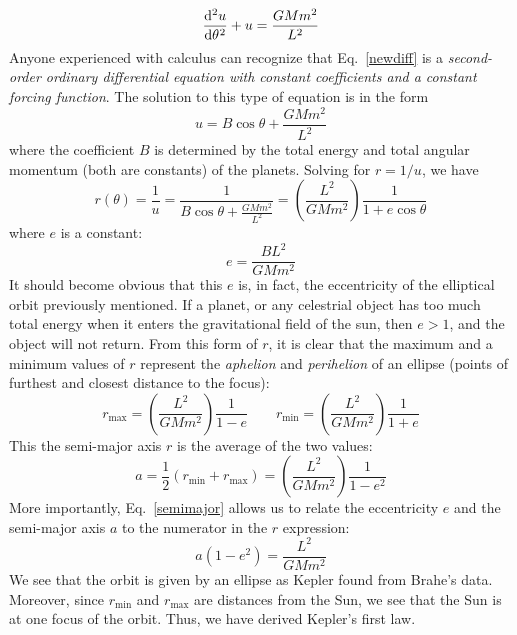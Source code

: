 \documentclass{../../../oss-handout}
\begin{document}
\begin{equation}
  \diff[2]u\theta + u = \frac{GMm^2}{L^2}
  \label{newdiff}
\end{equation}
Anyone experienced with calculus can recognize that Eq.\ \ref{newdiff} is a
\emph{second-order ordinary differential equation with constant coefficients
  and a constant forcing function}. The solution to this type of equation is in
the form
\begin{equation} 
  u =B\cos\theta + \frac{GMm^2}{L^2}
\end{equation}
where the coefficient $B$ is determined by the total energy and total angular
momentum (both are constants) of the planets. Solving for $r=1/u$, we have
\begin{equation}
  r(\theta)=\frac1u = \frac1{B\cos\theta+ \frac{GMm^2}{L^2}}
  =\left(\frac{L^2}{GMm^2}\right)\frac1{1+e\cos\theta}
\end{equation}
where $e$ is a constant:
\begin{equation}
  e=\dfrac{BL^2}{GMm^2}
\end{equation}
It should become obvious that this $e$ is, in fact, the eccentricity of the
elliptical orbit previously mentioned. If a planet, or any celestrial object
has too much total energy when it enters the gravitational field of the sun,
then $e>1$, and the object will not return. From this form of $r$, it is clear
that the maximum and a minimum values of $r$ represent the \emph{aphelion} and
\emph{perihelion} of an ellipse (points of furthest and closest distance to the
focus):
\begin{equation}
  r_\text{max}=\left(\frac{L^2}{GMm^2}\right)\frac1{1-e}
  \quad\quad
  r_\text{min}=\left(\frac{L^2}{GMm^2}\right)\frac1{1+e}
\end{equation}
This the semi-major axis $r$ is the average of the two values:
\begin{equation}
  a=\dfrac12\left(r_\text{min} + r_\text{max}\right)=
  \left(\frac{L^2}{GMm^2}\right)\frac1{1-e^2}
  \label{semimajor}
\end{equation}
More importantly, Eq.\ \ref{semimajor} allows us to relate the eccentricity
$e$ and the semi-major axis $a$ to the numerator in the $r$ expression:
\begin{equation}
  a(1-e^2)=\frac{L^2}{GMm^2}
  \label{eq:numerator}
\end{equation}
We see that the orbit is given by an ellipse as Kepler found from Brahe's data.
Moreover, since $r_\text{min}$ and $r_\text{max}$ are distances from the Sun, we
see that the Sun is at one focus of the orbit. Thus, we have derived Kepler's
first law.
\end{document}

